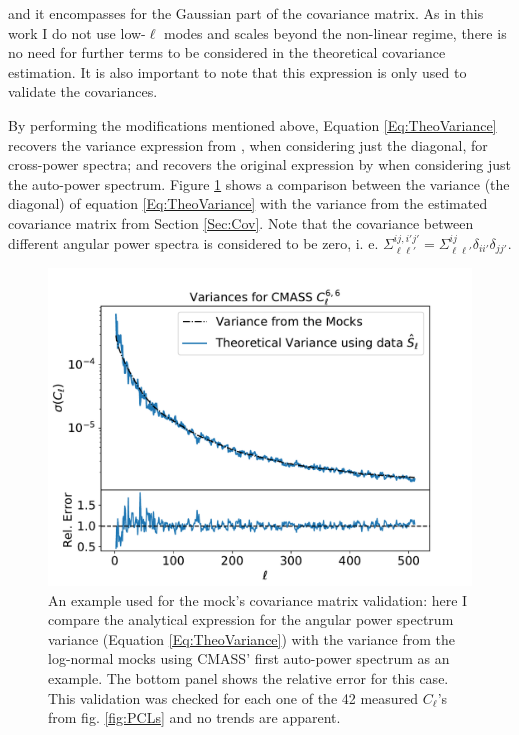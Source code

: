 and it encompasses for the Gaussian part of the covariance matrix. As in this work I do not use low-$\ell$ modes and scales beyond the non-linear regime, there is no need for further terms to be considered in the theoretical covariance estimation. It is also important to note that this expression is only used to validate the \flask covariances.

\qquad By performing the modifications mentioned above, Equation \eqref{Eq:TheoVariance} recovers the variance expression from \cite{Rassat2007}, when considering just the diagonal, for cross-power spectra; and recovers the original expression by \cite{2008DahlenSimons} when considering just the auto-power spectrum. Figure \ref{fig:Mocks_Variance} shows a comparison between the variance (the diagonal) of equation \eqref{Eq:TheoVariance} with the variance from the estimated covariance matrix from Section \ref{Sec:Cov}. Note that the covariance between different angular power spectra is considered to be zero, i. e. $\Sigma^{ij,i'j'}_{\ell\ell'} = \Sigma^{ij}_{\ell\ell'} \delta_{ii'}\delta_{jj'}$.

\begin{figure}
\begin{center}
\includegraphics[scale=0.55]{BOSS-FIGS/MocksValidation.pdf}
\caption[Mock's covariance matrix validation.]{An example used for the mock's covariance matrix validation: here I compare the analytical expression for the angular power spectrum variance (Equation \eqref{Eq:TheoVariance}) with the variance from the log-normal mocks using CMASS' first auto-power spectrum as an example. The bottom panel shows the relative error for this case. This validation was checked for each one of the 42 measured $C_{\ell}$'s from fig. \ref{fig:PCLs} and no trends are apparent.}
\label{fig:Mocks_Variance}
\end{center}
\end{figure}

